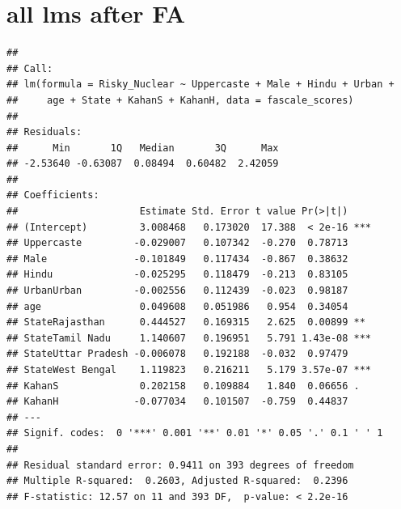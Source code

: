 \documentclass[
]{article}
\begin{document}
\hypertarget{all-lms-after-fa}{%
\section{all lms after FA}\label{all-lms-after-fa}}

\begin{verbatim}
## 
## Call:
## lm(formula = Risky_Nuclear ~ Uppercaste + Male + Hindu + Urban + 
##     age + State + KahanS + KahanH, data = fascale_scores)
## 
## Residuals:
##      Min       1Q   Median       3Q      Max 
## -2.53640 -0.63087  0.08494  0.60482  2.42059 
## 
## Coefficients:
##                     Estimate Std. Error t value Pr(>|t|)    
## (Intercept)         3.008468   0.173020  17.388  < 2e-16 ***
## Uppercaste         -0.029007   0.107342  -0.270  0.78713    
## Male               -0.101849   0.117434  -0.867  0.38632    
## Hindu              -0.025295   0.118479  -0.213  0.83105    
## UrbanUrban         -0.002556   0.112439  -0.023  0.98187    
## age                 0.049608   0.051986   0.954  0.34054    
## StateRajasthan      0.444527   0.169315   2.625  0.00899 ** 
## StateTamil Nadu     1.140607   0.196951   5.791 1.43e-08 ***
## StateUttar Pradesh -0.006078   0.192188  -0.032  0.97479    
## StateWest Bengal    1.119823   0.216211   5.179 3.57e-07 ***
## KahanS              0.202158   0.109884   1.840  0.06656 .  
## KahanH             -0.077034   0.101507  -0.759  0.44837    
## ---
## Signif. codes:  0 '***' 0.001 '**' 0.01 '*' 0.05 '.' 0.1 ' ' 1
## 
## Residual standard error: 0.9411 on 393 degrees of freedom
## Multiple R-squared:  0.2603, Adjusted R-squared:  0.2396 
## F-statistic: 12.57 on 11 and 393 DF,  p-value: < 2.2e-16
\end{verbatim}
\end{document}
